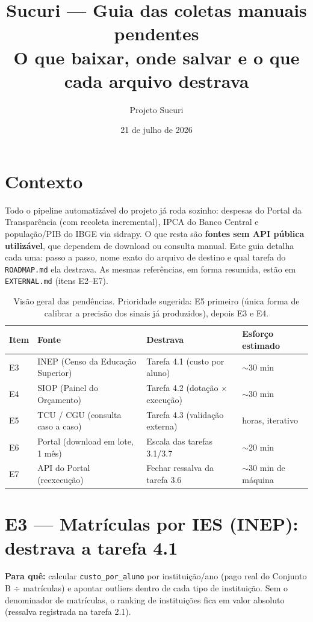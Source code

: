 \documentclass[11pt,a4paper]{article}
\title{Sucuri --- Guia das coletas manuais pendentes\\
\large O que baixar, onde salvar e o que cada arquivo destrava}
\author{Projeto Sucuri}
\date{21 de julho de 2026}
\begin{document}
\maketitle

\section*{Contexto}

Todo o pipeline automatizável do projeto já roda sozinho: despesas do
Portal da Transparência (com recoleta incremental), IPCA do Banco Central
e população/PIB do IBGE via sidrapy. O que resta são \textbf{fontes sem
API pública utilizável}, que dependem de download ou consulta manual.
Este guia detalha cada uma: passo a passo, nome exato do arquivo de
destino e qual tarefa do \texttt{ROADMAP.md} ela destrava. As mesmas
referências, em forma resumida, estão em \texttt{EXTERNAL.md} (itens
E2--E7).

\begin{table}[h]
\centering
\small
\begin{tabular}{llll}
\toprule
Item & Fonte & Destrava & Esforço estimado \\
\midrule
E3 & INEP (Censo da Educação Superior) & Tarefa 4.1 (custo por aluno) & $\sim$30 min \\
E4 & SIOP (Painel do Orçamento) & Tarefa 4.2 (dotação × execução) & $\sim$30 min \\
E5 & TCU / CGU (consulta caso a caso) & Tarefa 4.3 (validação externa) & horas, iterativo \\
E6 & Portal (download em lote, 1 mês) & Escala das tarefas 3.1/3.7 & $\sim$20 min \\
E7 & API do Portal (reexecução) & Fechar ressalva da tarefa 3.6 & $\sim$30 min de máquina \\
\bottomrule
\end{tabular}
\caption{Visão geral das pendências. Prioridade sugerida: E5 primeiro
(única forma de calibrar a precisão dos sinais já produzidos), depois E3 e E4.}
\end{table}

\section{E3 --- Matrículas por IES (INEP): destrava a tarefa 4.1}

\textbf{Para quê:} calcular \texttt{custo\_por\_aluno} por instituição/ano
(pago real do Conjunto B $\div$ matrículas) e apontar outliers dentro de
cada tipo de instituição. Sem o denominador de matrículas, o ranking de
instituições fica em valor absoluto (ressalva registrada na tarefa 2.1).
\end{document}

